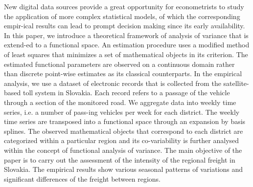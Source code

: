 
\begin{Abstrakt}
    New digital data sources provide a great opportunity for econometrists to study the application of more complex statistical models, of which the corresponding empir-ical results can lead to prompt decision making since its early availability. In this paper, we introduce a theoretical framework of analysis of variance that is extend-ed to a functional space. An estimation procedure uses a modified method of least squares that minimizes a set of mathematical objects in its criterion. The estimated functional parameters are observed on a continuous domain rather than discrete point-wise estimates as its classical counterparts. In the empirical analysis, we use a dataset of electronic records that is collected from the satellite-based toll system in Slovakia. Each record refers to a passage of the vehicle through a section of the monitored road. We aggregate data into weekly time series, i.e. a number of pass-ing vehicles per week for each district. The weekly time series are transposed into a functional space through an expansion by basis splines. The observed mathematical objects that correspond to each district are categorized within a particular region and its co-variability is further analysed within the concept of functional analysis of variance. The main objective of the paper is to carry out the assessment of the intensity of the regional freight in Slovakia. The empirical results show various seasonal patterns of variations and significant differences of the freight between regions.
\end{Abstrakt}



\clearpage